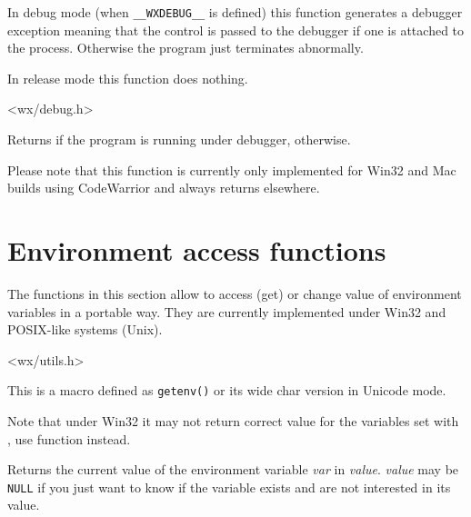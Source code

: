 
In debug mode (when {\tt \_\_WXDEBUG\_\_} is defined) this function generates a
debugger exception meaning that the control is passed to the debugger if one is
attached to the process. Otherwise the program just terminates abnormally.

In release mode this function does nothing.


<wx/debug.h>



\label{wxisdebuggerrunning}


Returns \true if the program is running under debugger, \false otherwise.

Please note that this function is currently only implemented for Win32 and Mac
builds using CodeWarrior and always returns \false elsewhere.




\section{Environment access functions}\label{environfunctions}

The functions in this section allow to access (get) or change value of
environment variables in a portable way. They are currently implemented under
Win32 and POSIX-like systems (Unix).



<wx/utils.h>


\label{wxgetenvmacro}


This is a macro defined as {\tt getenv()} or its wide char version in Unicode
mode.

Note that under Win32 it may not return correct value for the variables set
with , use  function
instead.


\label{wxgetenv}


Returns the current value of the environment variable {\it var} in {\it value}.
{\it value} may be {\tt NULL} if you just want to know if the variable exists
and are not interested in its value.

